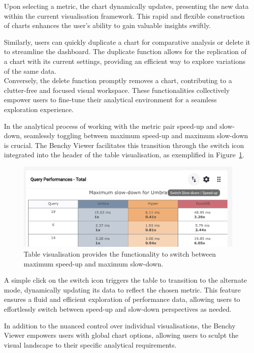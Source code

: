 Upon selecting a metric, the chart dynamically updates, presenting the new data within the current visualisation framework. This rapid and flexible construction of charts enhances the user's ability to gain valuable insights swiftly.

Similarly, users can quickly duplicate a chart for comparative analysis or delete it to streamline the dashboard. The duplicate function allows for the replication of a chart with its current settings, providing an efficient way to explore variations of the same data.\\
Conversely, the delete function promptly removes a chart, contributing to a clutter-free and focused visual workspace. These functionalities collectively empower users to fine-tune their analytical environment for a seamless exploration experience.

In the analytical process of working with the metric pair speed-up and slow-down, seamlessly toggling between maximum speed-up and maximum slow-down is crucial. The Benchy Viewer facilitates this transition through the switch icon integrated into the header of the table visualisation, as exemplified in Figure~\ref{fig:chart-configuration-table-switch}.

\begin{figure}[h]
  \centering
  \includegraphics[width=0.8\linewidth]{figures/chart-configuration-table-switch.png}
  \caption{Table visualisation provides the functionality to switch between maximum speed-up and maximum slow-down.}
  \label{fig:chart-configuration-table-switch}
\end{figure}

A simple click on the switch icon triggers the table to transition to the alternate mode, dynamically updating its data to reflect the chosen metric. This feature ensures a fluid and efficient exploration of performance data, allowing users to effortlessly switch between speed-up and slow-down perspectives as needed.


In addition to the nuanced control over individual visualisations, the Benchy Viewer empowers users with global chart options, allowing users to sculpt the visual landscape to their specific analytical requirements.

